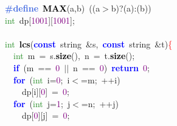 \noindent
\mbox{}\textbf{\textcolor{RoyalBlue}{\#define}}\ \textbf{\textcolor{Black}{MAX}}\textcolor{BrickRed}{(}a\textcolor{BrickRed}{,}b\textcolor{BrickRed}{)}\ \textcolor{BrickRed}{((}a\textcolor{BrickRed}{$>$}b\textcolor{BrickRed}{)?(}a\textcolor{BrickRed}{):(}b\textcolor{BrickRed}{))} \\
\mbox{}\textcolor{ForestGreen}{int}\ dp\textcolor{BrickRed}{[}\textcolor{Purple}{1001}\textcolor{BrickRed}{][}\textcolor{Purple}{1001}\textcolor{BrickRed}{];} \\
\mbox{} \\
\mbox{}\textcolor{ForestGreen}{int}\ \textbf{\textcolor{Black}{lcs}}\textcolor{BrickRed}{(}\textbf{\textcolor{Blue}{const}}\ string\ \textcolor{BrickRed}{\&}s\textcolor{BrickRed}{,}\ \textbf{\textcolor{Blue}{const}}\ string\ \textcolor{BrickRed}{\&}t\textcolor{BrickRed}{)}\textcolor{Red}{\{} \\
\mbox{}\ \ \textcolor{ForestGreen}{int}\ m\ \textcolor{BrickRed}{=}\ s\textcolor{BrickRed}{.}\textbf{\textcolor{Black}{size}}\textcolor{BrickRed}{(),}\ n\ \textcolor{BrickRed}{=}\ t\textcolor{BrickRed}{.}\textbf{\textcolor{Black}{size}}\textcolor{BrickRed}{();} \\
\mbox{}\ \ \textbf{\textcolor{Blue}{if}}\ \textcolor{BrickRed}{(}m\ \textcolor{BrickRed}{==}\ \textcolor{Purple}{0}\ \textcolor{BrickRed}{$|$$|$}\ n\ \textcolor{BrickRed}{==}\ \textcolor{Purple}{0}\textcolor{BrickRed}{)}\ \textbf{\textcolor{Blue}{return}}\ \textcolor{Purple}{0}\textcolor{BrickRed}{;} \\
\mbox{}\ \ \textbf{\textcolor{Blue}{for}}\ \textcolor{BrickRed}{(}\textcolor{ForestGreen}{int}\ i\textcolor{BrickRed}{=}\textcolor{Purple}{0}\textcolor{BrickRed}{;}\ i\textcolor{BrickRed}{$<$=}m\textcolor{BrickRed}{;}\ \textcolor{BrickRed}{++}i\textcolor{BrickRed}{)} \\
\mbox{}\ \ \ \ dp\textcolor{BrickRed}{[}i\textcolor{BrickRed}{][}\textcolor{Purple}{0}\textcolor{BrickRed}{]}\ \textcolor{BrickRed}{=}\ \textcolor{Purple}{0}\textcolor{BrickRed}{;} \\
\mbox{}\ \ \textbf{\textcolor{Blue}{for}}\ \textcolor{BrickRed}{(}\textcolor{ForestGreen}{int}\ j\textcolor{BrickRed}{=}\textcolor{Purple}{1}\textcolor{BrickRed}{;}\ j\textcolor{BrickRed}{$<$=}n\textcolor{BrickRed}{;}\ \textcolor{BrickRed}{++}j\textcolor{BrickRed}{)} \\
\mbox{}\ \ \ \ dp\textcolor{BrickRed}{[}\textcolor{Purple}{0}\textcolor{BrickRed}{][}j\textcolor{BrickRed}{]}\ \textcolor{BrickRed}{=}\ \textcolor{Purple}{0}\textcolor{BrickRed}{;} \\
